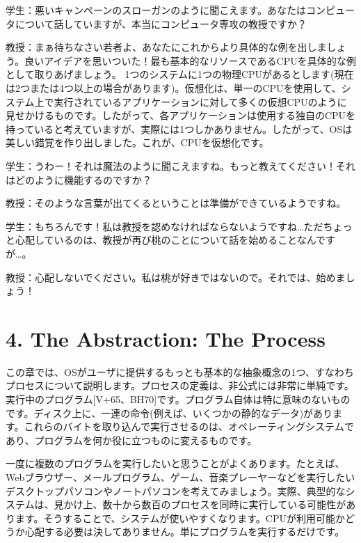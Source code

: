学生：悪いキャンペーンのスローガンのように聞こえます。あなたはコンピュータについて話していますが、本当にコンピュータ専攻の教授ですか？

教授：まぁ待ちなさい若者よ、あなたにこれからより具体的な例を出しましょう。良いアイデアを思いついた！最も基本的なリソースであるCPUを具体的な例として取りあげましょう。
1つのシステムに1つの物理CPUがあるとします(現在は2つまたは4つ以上の場合があります)。仮想化は、単一のCPUを使用して、システム上で実行されているアプリケーションに対して多くの仮想CPUのように見せかけるものです。したがって、各アプリケーションは使用する独自のCPUを持っていると考えていますが、実際には1つしかありません。したがって、OSは美しい錯覚を作り出しました。これが、CPUを仮想化です。

学生：うわー！それは魔法のように聞こえますね。もっと教えてください！それはどのように機能するのですか？

教授：そのような言葉が出てくるということは準備ができているようですね。

学生：もちろんです！私は教授を認めなければならないようですね\ldots ただちょっと心配しているのは、教授が再び桃のことについて話を始めることなんですが\ldots。

教授：心配しないでください。私は桃が好きではないので。それでは、始めましょう！

\newpage

\hypertarget{the-abstraction-the-process}{%
\section*{4. The Abstraction: The
Process}\label{the-abstraction-the-process}}

この章では、OSがユーザに提供するもっとも基本的な抽象概念の1つ、すなわちプロセスについて説明します。プロセスの定義は、非公式には非常に単純です。実行中のプログラム{[}V+65、BH70{]}です。プログラム自体は特に意味のないものです。ディスク上に、一連の命令(例えば、いくつかの静的なデータ)があります。これらのバイトを取り込んで実行させるのは、オペレーティングシステムであり、プログラムを何か役に立つものに変えるものです。

一度に複数のプログラムを実行したいと思うことがよくあります。たとえば、Webブラウザー、メールプログラム、ゲーム、音楽プレーヤーなどを実行したいデスクトップパソコンやノートパソコンを考えてみましょう。実際、典型的なシステムは、見かけ上、数十から数百のプロセスを同時に実行している可能性があります。そうすることで、システムが使いやすくなります。CPUが利用可能かどうか心配する必要は決してありません。単にプログラムを実行するだけです。

